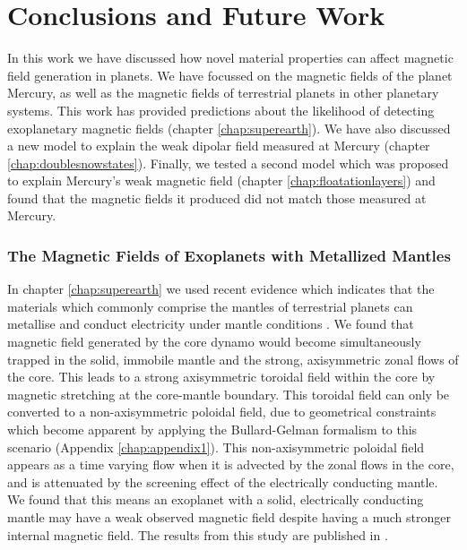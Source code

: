 
\chapter{Conclusions and Future Work}
\label{chap:conclusion}
In this work we have discussed how novel material properties can affect magnetic field generation in planets. We have focussed on the magnetic fields of the planet Mercury, as well as the magnetic fields of terrestrial planets in other planetary systems. This work has provided predictions about the likelihood of detecting exoplanetary magnetic fields (chapter \ref{chap:superearth}). We have also discussed a new model to explain the weak dipolar field measured at Mercury (chapter \ref{chap:doublesnowstates}). Finally, we tested a second model which was proposed \citep{smith2012, hauck2013} to explain Mercury's weak magnetic field (chapter \ref{chap:floatationlayers}) and found that the magnetic fields it produced did not match those measured at Mercury.

\subsection{The Magnetic Fields of Exoplanets with Metallized Mantles}
In chapter \ref{chap:superearth} we used recent evidence which indicates that the materials which commonly comprise the mantles of terrestrial planets can metallise and conduct electricity under mantle conditions \citep{nellis2010, tsuchiya2011, ohta2012}. We found that magnetic field generated by the core dynamo would become simultaneously trapped in the solid, immobile mantle and the strong, axisymmetric zonal flows of the core. This leads to a strong axisymmetric toroidal field within the core by magnetic stretching at the core-mantle boundary. This toroidal field can only be converted to a non-axisymmetric poloidal field, due to geometrical constraints which become apparent by applying the Bullard-Gelman formalism to this scenario (Appendix \ref{chap:appendix1}). This non-axisymmetric poloidal field appears as a time varying flow when it is advected by the zonal flows in the core, and is attenuated by the screening effect of the electrically conducting mantle. We found that this means an exoplanet with a solid, electrically conducting mantle may have a weak observed magnetic field despite having a much stronger internal magnetic field. The results from this study are published in \citet{vilim2013}.
 

